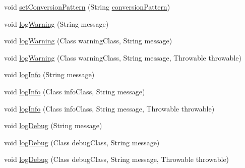\begin{DoxyCompactItemize}
\item 
void \mbox{\hyperlink{classnet_1_1dlinkddns_1_1atulsaurabh_1_1hasselfreelogger_1_1impl_1_1_hassel_free_logger_a23a1e3b5c56528e197c7eb3832e7c69e}{set\+Conversion\+Pattern}} (String \mbox{\hyperlink{classnet_1_1dlinkddns_1_1atulsaurabh_1_1hasselfreelogger_1_1impl_1_1_hassel_free_logger_a9e05fdd81d207cfd60132cc3b15b26cb}{conversion\+Pattern}})
\item 
void \mbox{\hyperlink{classnet_1_1dlinkddns_1_1atulsaurabh_1_1hasselfreelogger_1_1impl_1_1_hassel_free_logger_a9e847886284d6a0f7edef691e2d11efd}{log\+Warning}} (String message)
\item 
void \mbox{\hyperlink{classnet_1_1dlinkddns_1_1atulsaurabh_1_1hasselfreelogger_1_1impl_1_1_hassel_free_logger_ad5f8400bc0ea2500509a4154cfa48bf5}{log\+Warning}} (Class warning\+Class, String message)
\item 
void \mbox{\hyperlink{classnet_1_1dlinkddns_1_1atulsaurabh_1_1hasselfreelogger_1_1impl_1_1_hassel_free_logger_ac5e36ee2095f1f92c90885360a0fd1f1}{log\+Warning}} (Class warning\+Class, String message, Throwable throwable)
\item 
void \mbox{\hyperlink{classnet_1_1dlinkddns_1_1atulsaurabh_1_1hasselfreelogger_1_1impl_1_1_hassel_free_logger_abca8e8a8a8c85d582092b35fc395d726}{log\+Info}} (String message)
\item 
void \mbox{\hyperlink{classnet_1_1dlinkddns_1_1atulsaurabh_1_1hasselfreelogger_1_1impl_1_1_hassel_free_logger_a011e8791e13b815927a16254e9cfa2a3}{log\+Info}} (Class info\+Class, String message)
\item 
void \mbox{\hyperlink{classnet_1_1dlinkddns_1_1atulsaurabh_1_1hasselfreelogger_1_1impl_1_1_hassel_free_logger_ac0596a92805b29d9402a9eb17c71891a}{log\+Info}} (Class info\+Class, String message, Throwable throwable)
\item 
void \mbox{\hyperlink{classnet_1_1dlinkddns_1_1atulsaurabh_1_1hasselfreelogger_1_1impl_1_1_hassel_free_logger_a7aafa489bd14255cbdb43c1f2494d433}{log\+Debug}} (String message)
\item 
void \mbox{\hyperlink{classnet_1_1dlinkddns_1_1atulsaurabh_1_1hasselfreelogger_1_1impl_1_1_hassel_free_logger_a7c65f65791b715d7c72a2227a8a00bdc}{log\+Debug}} (Class debug\+Class, String message)
\item 
void \mbox{\hyperlink{classnet_1_1dlinkddns_1_1atulsaurabh_1_1hasselfreelogger_1_1impl_1_1_hassel_free_logger_a0995d59f7b5262af4be98f4e7ba21cd0}{log\+Debug}} (Class debug\+Class, String message, Throwable throwable)
\item 

\end{DoxyCompactItemize}
